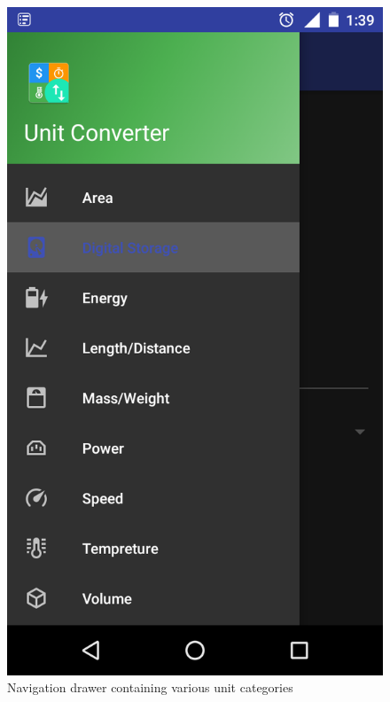 \documentclass[a4paper, 12pt]{report}
\begin{document}
\begin{center}
\begin{figure}
\centering
\includegraphics[scale = 0.35]{./ss2}
\caption{Navigation drawer containing various unit categories}
\end{figure}
\end{center}
\end{document}
